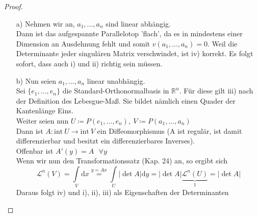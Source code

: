 \begin{proof}
    \mbox{}
    \begin{enumerate}
        \item[a)] 
            Nehmen wir an, $a_1, \ldots, a_n$ sind linear abhängig. \\
            Dann ist das aufgespannte Parallelotop 'flach', da es in mindestens 
            einer Dimension an Ausdehnung fehlt und somit
            $v(a_1, \ldots, a_n) = 0 $. Weil die Determinante jeder singulären Matrix verschwindet, ist iv) korrekt. Es folgt sofort, dass auch i) und ii) richtig sein müssen.
        \item[b)]
            Nun seien $a_1, \ldots, a_n$ linear unabhängig. \\
            Sei $\lbrace e_1, \ldots, e_n \rbrace$ die Standard-Orthonormalbasis in
            $\mathbb{R}^n $. Für diese gilt iii) nach der Definition des Lebesgue-Maß. Sie bildet nämlich einen Quader der Kantenlänge Eins. \\
            Weiter seien nun $U \coloneqq P(e_1, \ldots, e_n),\
            V \coloneqq P(a_1, \ldots, a_n) $ \\
            Dann ist $A: \mathrm{int}\ U \rightarrow \mathrm{int}\ V $
            ein Diffeomorphismus (A ist regulär, ist damit differenzierbar und
            besitzt ein differenzierbares Inverses). \\
            Offenbar ist $A'(y) = A \ \ \ \forall y $ \\
            Wenn wir nun den Transformationssatz (Kap. 24) an, so ergibt sich
            \begin{equation*}
            	\mathcal{L}^n (V) = \int\limits_V \mathrm{d}x \stackrel{y = Ax}{=}
            	\int\limits_U |\det A| \mathrm{d}y = |\det A| \underbrace{\mathcal{L}^n (U)}_1
           		 = |\det A|
           	\end{equation*}
            Daraus folgt iv) und i), ii), iii) als Eigenschaften
            der Determinanten
    \end{enumerate}
\end{proof}

